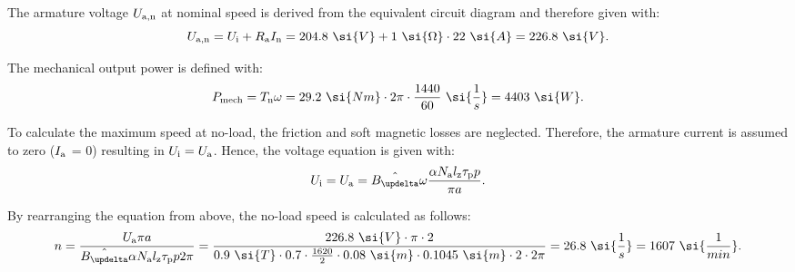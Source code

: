 \begin{solutionblock}
    The armature voltage $U_{\mathrm{a,n}}$ at nominal speed is derived from the equivalent circuit diagram and therefore given with:
    \begin{equation}
        \Uan = \Ui + \Ra \In
        = 204.8 \ \si{V} + 1 \ \si{\Omega} \cdot 22 \ \si{A}
        = 226.8 \ \si{V}.
    \end{equation}

    The mechanical output power is defined with:
    \begin{equation}
        P_{\mathrm{mech}} = \Tn \omega
        = 29.2 \ \si{Nm} \cdot 2\pi \cdot \frac{1440}{60} \ \si{\frac{1}{s}}
        = 4403 \ \si{W}.
    \end{equation}

    To calculate the maximum speed at no-load, the friction and soft magnetic losses are neglected. Therefore, the armature current is assumed to zero ($I_{\mathrm{a}}$ = 0) resulting in $U_{\mathrm{i}} = U_{\mathrm{a}}$.
    Hence, the voltage equation is given with:
    \begin{equation}
        \Ui = \Ua = \hat{B_{\updelta}} \omega \frac{\alpha N_{\mathrm{a}} \lz \taup p}{\pi a}.
    \end{equation}

    By rearranging the equation from above, the no-load speed is calculated as follows:
    \begin{equation}
        n = \frac{\Ua \pi a}{\hat{B_{\updelta}} \alpha N_{\mathrm{a}} \lz \taup p 2\pi}
        = \frac{226.8 \ \si{V} \cdot \pi \cdot 2}{0.9 \ \si{T} \cdot 0.7 \cdot \frac{1620}{2} \cdot 0.08 \ \si{m} \cdot 0.1045 \ \si{m} \cdot 2 \cdot 2\pi}
        = 26.8 \ \si{\frac{1}{s}} = 1607 \ \si{\frac{1}{min}}.
    \end{equation}

\end{solutionblock}




